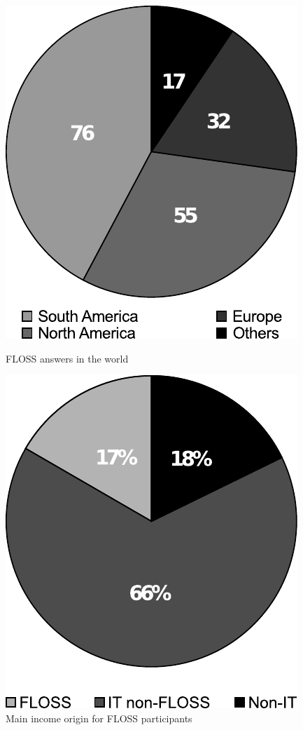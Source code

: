\documentclass[lnbip]{svmultln}
\begin{document}
\begin{figure}[htb]
  \begin{minipage}[t]{0.5\linewidth}
    \includegraphics[scale=0.8]{floss-world.pdf}
    \caption{FLOSS answers in the world}
    \label{fig:floss-world}
  \end{minipage}
  \begin{minipage}[t]{0.5\linewidth}
    \includegraphics[scale=0.8]{floss-income.pdf}
    \caption{Main income origin for FLOSS participants}
    \label{fig:floss-income}
  \end{minipage}
\end{figure}
\end{document}
